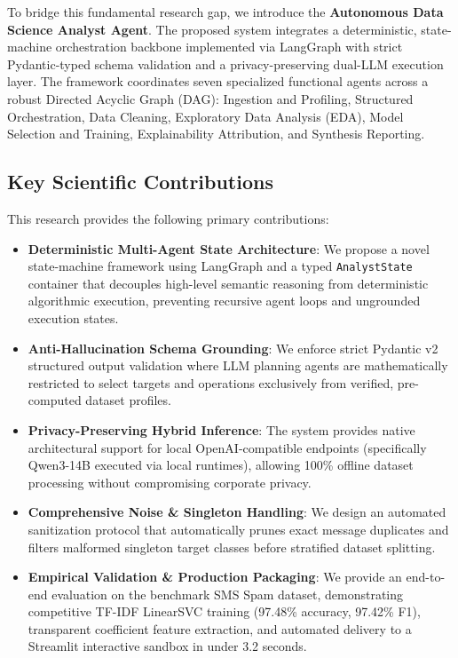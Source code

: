 \documentclass[conference]{IEEEtran}
\begin{document}
To bridge this fundamental research gap, we introduce the \textbf{Autonomous Data Science Analyst Agent}. The proposed system integrates a deterministic, state-machine orchestration backbone implemented via LangGraph \cite{langgraphdocs} with strict Pydantic-typed schema validation \cite{pydantic2023} and a privacy-preserving dual-LLM execution layer. The framework coordinates seven specialized functional agents across a robust Directed Acyclic Graph (DAG): Ingestion and Profiling, Structured Orchestration, Data Cleaning, Exploratory Data Analysis (EDA), Model Selection and Training, Explainability Attribution, and Synthesis Reporting.

\subsection{Key Scientific Contributions}
This research provides the following primary contributions:
\begin{itemize}
    \item \textbf{Deterministic Multi-Agent State Architecture}: We propose a novel state-machine framework using LangGraph and a typed \texttt{AnalystState} container that decouples high-level semantic reasoning from deterministic algorithmic execution, preventing recursive agent loops and ungrounded execution states.
    \item \textbf{Anti-Hallucination Schema Grounding}: We enforce strict Pydantic v2 structured output validation where LLM planning agents are mathematically restricted to select targets and operations exclusively from verified, pre-computed dataset profiles.
    \item \textbf{Privacy-Preserving Hybrid Inference}: The system provides native architectural support for local OpenAI-compatible endpoints (specifically Qwen3-14B executed via local runtimes), allowing 100\% offline dataset processing without compromising corporate privacy.
    \item \textbf{Comprehensive Noise \& Singleton Handling}: We design an automated sanitization protocol that automatically prunes exact message duplicates and filters malformed singleton target classes before stratified dataset splitting.
    \item \textbf{Empirical Validation \& Production Packaging}: We provide an end-to-end evaluation on the benchmark SMS Spam dataset, demonstrating competitive TF-IDF LinearSVC training (97.48\% accuracy, 97.42\% F1), transparent coefficient feature extraction, and automated delivery to a Streamlit interactive sandbox in under 3.2 seconds.
\end{itemize}
\end{document}
